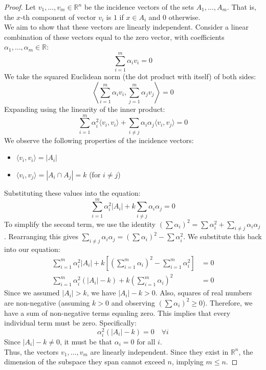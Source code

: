 \documentclass[a4paper]{article}
\begin{document}
\begin{proof}
Let $v_1, \dots, v_m \in \mathbb{R}^n$ be the incidence vectors of the sets $A_1, \dots, A_m$. That is, the $x$-th component of vector $v_i$ is $1$ if $x \in A_i$ and $0$ otherwise.\\
We aim to show that these vectors are linearly independent. Consider a linear combination of these vectors equal to the zero vector, with coefficients $\alpha_1, \dots, \alpha_m \in \mathbb{R}$:
\begin{equation}
    \sum_{i=1}^m \alpha_i v_i = 0
\end{equation}
We take the squared Euclidean norm (the dot product with itself) of both sides:
\[
    \left\langle \sum_{i=1}^m \alpha_i v_i, \sum_{j=1}^m \alpha_j v_j \right\rangle = 0
\]
Expanding using the linearity of the inner product:
\[
    \sum_{i=1}^m \alpha_i^2 \langle v_i, v_i \rangle + \sum_{i \neq j} \alpha_i \alpha_j \langle v_i, v_j \rangle = 0
\]
We observe the following properties of the incidence vectors:
\begin{itemize}
    \item $\langle v_i, v_i \rangle = |A_i|$
    \item $\langle v_i, v_j \rangle = |A_i \cap A_j| = k$ (for $i \neq j$)
\end{itemize}
Substituting these values into the equation:
\[
    \sum_{i=1}^m \alpha_i^2 |A_i| + k \sum_{i \neq j} \alpha_i \alpha_j = 0
\]
To simplify the second term, we use the identity $(\sum \alpha_i)^2 = \sum \alpha_i^2 + \sum_{i \neq j} \alpha_i \alpha_j$. Rearranging this gives $\sum_{i \neq j} \alpha_i \alpha_j = (\sum \alpha_i)^2 - \sum \alpha_i^2$. We substitute this back into our equation:
\begin{align*}
    \sum_{i=1}^m \alpha_i^2 |A_i| + k \left[ \left(\sum_{i=1}^m \alpha_i\right)^2 - \sum_{i=1}^m \alpha_i^2 \right] &= 0 \\
    \sum_{i=1}^m \alpha_i^2 (|A_i| - k) + k \left(\sum_{i=1}^m \alpha_i\right)^2 &= 0
\end{align*}
Since we assumed $|A_i| > k$, we have $|A_i| - k > 0$. Also, squares of real numbers are non-negative (assuming $k > 0$ and observing $(\sum \alpha_i)^2 \geq 0$). Therefore, we have a sum of non-negative terms equaling zero. This implies that every individual term must be zero. Specifically:
\[
    \alpha_i^2 (|A_i| - k) = 0 \quad \forall i
\]
Since $|A_i| - k \neq 0$, it must be that $\alpha_i = 0$ for all $i$.\\
Thus, the vectors $v_1, \dots, v_m$ are linearly independent. Since they exist in $\mathbb{R}^n$, the dimension of the subspace they span cannot exceed $n$, implying $m \leq n$.
\end{proof}
\end{document}

